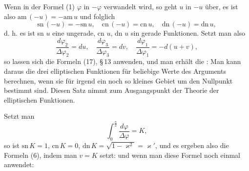 
Wenn in der Formel (1) $\varphi$ in $-\varphi$ verwandelt wird, so geht $u$ in $-u$ über, es ist also $\mathrm{am}\,(-u) = -\mathrm{am}\,u$ und folglich
\[
\mathrm{sn}\,(-u) = -\mathrm{sn}\,u,\quad \mathrm{cn}\,(-u) = \mathrm{cn}\,u,\quad \mathrm{dn}\,(-u) = \mathrm{dn}\,u,
\]
d. h. es ist sn $u$ eine ungerade, cn $u$, dn $u$ sin gerade Funktionen. %
Setzt man also
\[
\frac{d\varphi_2}{\Delta\varphi_2} = du,\quad \frac{d\varphi_3}{\Delta\varphi_3} = dv,\quad \frac{d\varphi_1}{\Delta\varphi_1} = -d(u+v),
\]
so lassen sich die Formeln (17), §\,13 anwenden, und man erhält die :
Man kann daraus die drei elliptischen Funktionen für beliebige Werte des Arguments  berechnen, wenn sie für irgend ein noch so kleines Gebiet um den Nullpunkt bestimmt sind. Diesen Satz nimmt  zum Ausgangspunkt der Theorie der elliptischen Funktionen.

Setzt man
\[
\int_0^{\frac{\pi}{2}} \frac{d\varphi}{\Delta\varphi} = K,
\]
so ist $\mathrm{sn}\,K = 1$, $\mathrm{cn}\,K = 0$, $\mathrm{dn}\,K = \sqrt{1-\varkappa^2} = \varkappa'$, und es ergeben also die Formeln (6), indem man $v = K$ setzt:
und wenn man diese Formel noch einmal anwendet:
